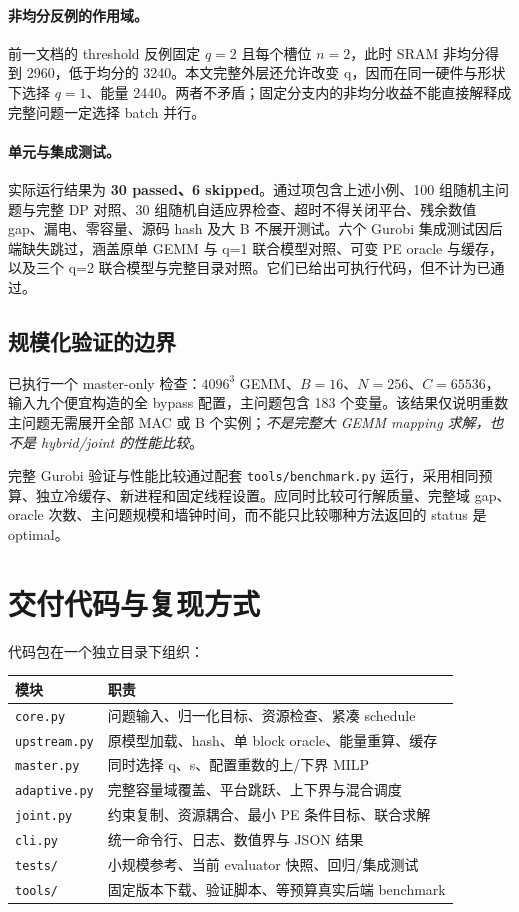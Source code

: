 \documentclass[UTF8,11pt,a4paper,fontset=fandol]{ctexart}
\theoremstyle{remark}\newtheorem{remark}[proposition]{说明}
\numberwithin{equation}{section}
\begin{document}
\paragraph{非均分反例的作用域。}
前一文档的 threshold 反例固定 $q=2$ 且每个槽位 $n=2$，此时 SRAM 非均分得到 2960，低于均分的 3240。本文完整外层还允许改变 q，因而在同一硬件与形状下选择 $q=1$、能量 2440。两者不矛盾；固定分支内的非均分收益不能直接解释成完整问题一定选择 batch 并行。

\paragraph{单元与集成测试。}
实际运行结果为 \textbf{30 passed、6 skipped}。通过项包含上述小例、100 组随机主问题与完整 DP 对照、30 组随机自适应界检查、超时不得关闭平台、残余数值 gap、漏电、零容量、源码 hash 及大 B 不展开测试。六个 Gurobi 集成测试因后端缺失跳过，涵盖原单 GEMM 与 q=1 联合模型对照、可变 PE oracle 与缓存，以及三个 q=2 联合模型与完整目录对照。它们已给出可执行代码，但不计为已通过。

\subsection{规模化验证的边界}
已执行一个 master-only 检查：$4096^3$ GEMM、$B=16$、$N=256$、$C=65536$，输入九个便宜构造的全 bypass 配置，主问题包含 183 个变量。该结果仅说明重数主问题无需展开全部 MAC 或 B 个实例；\emph{不是完整大 GEMM mapping 求解，也不是 hybrid/joint 的性能比较}。

完整 Gurobi 验证与性能比较通过配套 \texttt{tools/benchmark.py} 运行，采用相同预算、独立冷缓存、新进程和固定线程设置。应同时比较可行解质量、完整域 gap、oracle 次数、主问题规模和墙钟时间，而不能只比较哪种方法返回的 status 是 optimal。

\clearpage
\section{交付代码与复现方式}
\label{sec:reproduce}
代码包在一个独立目录下组织：
\begin{center}\small
\begin{tabularx}{\linewidth}{lX}
\toprule
模块 & 职责\\
\midrule
\texttt{core.py} & 问题输入、归一化目标、资源检查、紧凑 schedule\\
\texttt{upstream.py} & 原模型加载、hash、单 block oracle、能量重算、缓存\\
\texttt{master.py} & 同时选择 q、s、配置重数的上/下界 MILP\\
\texttt{adaptive.py} & 完整容量域覆盖、平台跳跃、上下界与混合调度\\
\texttt{joint.py} & 约束复制、资源耦合、最小 PE 条件目标、联合求解\\
\texttt{cli.py} & 统一命令行、日志、数值界与 JSON 结果\\
\texttt{tests/} & 小规模参考、当前 evaluator 快照、回归/集成测试\\
\texttt{tools/} & 固定版本下载、验证脚本、等预算真实后端 benchmark\\
\bottomrule
\end{tabularx}
\end{center}
\end{document}
